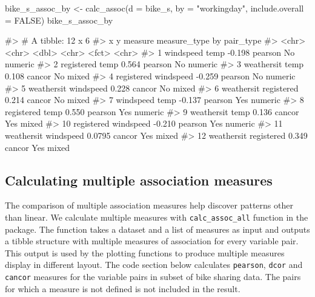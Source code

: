 \begin{Schunk}
\begin{Sinput}
bike_s_assoc_by <- calc_assoc(d = bike_s,
                            by = "workingday",
                            include.overall = FALSE)
bike_s_assoc_by
\end{Sinput}
\begin{Soutput}
#> # A tibble: 12 x 6
#>    x          y          measure measure_type by    pair_type
#>    <chr>      <chr>        <dbl> <chr>        <fct> <chr>    
#>  1 windspeed  temp       -0.198  pearson      No    numeric  
#>  2 registered temp        0.564  pearson      No    numeric  
#>  3 weathersit temp        0.108  cancor       No    mixed    
#>  4 registered windspeed  -0.259  pearson      No    numeric  
#>  5 weathersit windspeed   0.228  cancor       No    mixed    
#>  6 weathersit registered  0.214  cancor       No    mixed    
#>  7 windspeed  temp       -0.137  pearson      Yes   numeric  
#>  8 registered temp        0.550  pearson      Yes   numeric  
#>  9 weathersit temp        0.136  cancor       Yes   mixed    
#> 10 registered windspeed  -0.210  pearson      Yes   numeric  
#> 11 weathersit windspeed   0.0795 cancor       Yes   mixed    
#> 12 weathersit registered  0.349  cancor       Yes   mixed
\end{Soutput}
\end{Schunk}

\hypertarget{calculating-multiple-association-measures}{%
\subsection{Calculating multiple association
measures}\label{calculating-multiple-association-measures}}

The comparison of multiple association measures help discover patterns
other than linear. We calculate multiple measures with
\texttt{calc\_assoc\_all} function in the package. The function takes a
dataset and a list of measures as input and outputs a tibble structure
with multiple measures of association for every variable pair. This
output is used by the plotting functions to produce multiple measures
display in different layout. The code section below calculates
\texttt{pearson}, \texttt{dcor} and \texttt{cancor} measures for the
variable pairs in subset of bike sharing data. The pairs for which a
measure is not defined is not included in the result.

